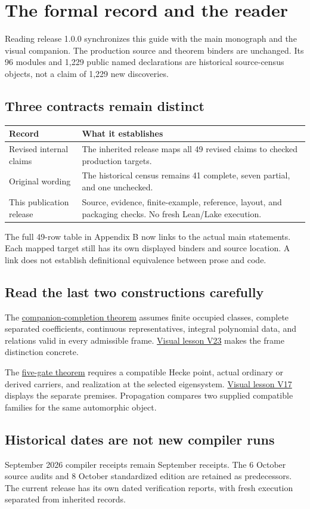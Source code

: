 \section*{The formal record and the reader}
Reading release 1.0.0 synchronizes this guide with the main monograph and the visual companion. The production source and theorem binders are unchanged. Its 96 modules and 1,229 public named declarations are historical source-census objects, not a claim of 1,229 new discoveries.

\subsection*{Three contracts remain distinct}
\begin{center}\begin{tabular}{>{\raggedright\arraybackslash}p{.28\linewidth}>{\raggedright\arraybackslash}p{.62\linewidth}}\toprule
Record & What it establishes\\\midrule
Revised internal claims & The inherited release maps all 49 revised claims to checked production targets.\\
Original wording & The historical census remains 41 complete, seven partial, and one unchecked.\\
This publication release & Source, evidence, finite-example, reference, layout, and packaging checks. No fresh Lean/Lake execution.\\\bottomrule
\end{tabular}\end{center}
The full 49-row table in Appendix B now links to the actual main statements. Each mapped target still has its own displayed binders and source location. A link does not establish definitional equivalence between prose and code.

\subsection*{Read the last two constructions carefully}
The \href{p12-route:lean-completion}{companion-completion theorem} assumes finite occupied classes, complete separated coefficients, continuous representatives, integral polynomial data, and relations valid in every admissible frame. \href{p12-route:lean-visual23}{Visual lesson V23} makes the frame distinction concrete.

The \href{p12-route:lean-five}{five-gate theorem} requires a compatible Hecke point, actual ordinary or derived carriers, and realization at the selected eigensystem. \href{p12-route:lean-visual17}{Visual lesson V17} displays the separate premises. Propagation compares two supplied compatible families for the same automorphic object.

\subsection*{Historical dates are not new compiler runs}
September 2026 compiler receipts remain September receipts. The 6 October source audits and 8 October standardized edition are retained as predecessors. The current release has its own dated verification reports, with fresh execution separated from inherited records.
\clearpage
